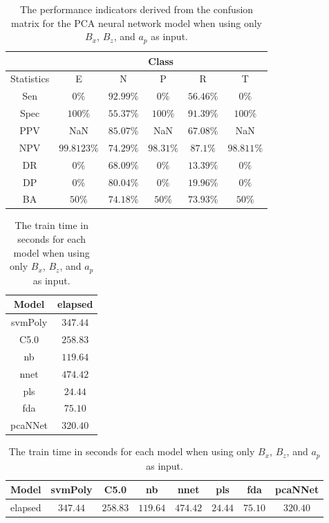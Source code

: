 \begin{table}[!ht]
	\centering
	\begin{tabular}{|c|c|c|c|c|c|}
		\hline
		 & \multicolumn{5}{c|}{Class} \\ \hline
		Statistics & E & N & P & R & T \\ \hline
		Sen & $0\%$ & $92.99\%$ & $0\%$ & $56.46\%$ & $0\%$ \\ \hline
		Spec & $100\%$ & $55.37\%$ & $100\%$ & $91.39\%$ & $100\%$ \\ \hline
		PPV & NaN & $85.07\%$ & NaN & $67.08\%$ & NaN \\ \hline
		NPV & $99.8123\%$ & $74.29\%$ & $98.31\%$ & $87.1\%$ & $98.811\%$ \\ \hline
		DR & $0\%$ & $68.09\%$ & $0\%$ & $13.39\%$ & $0\%$ \\ \hline
		DP & $0\%$ & $80.04\%$ & $0\%$ & $19.96\%$ & $0\%$ \\ \hline
		BA & $50\%$ & $74.18\%$ & $50\%$ & $73.93\%$ & $50\%$ \\ \hline
	\end{tabular}
	\caption{The performance indicators derived from the confusion matrix for the PCA neural network model when using only $B_{x}$, $B_{z}$, and $a_{p}$ as input.}
	\label{tab:cs:reverse:xzap:pcaNNet}
\end{table}

\begin{table}[!ht]
	\centering
	\begin{tabular}{|c|c|}
		\hline
		Model & elapsed \\ \hline
		svmPoly & $347.44$ \\ \hline
		C5.0 & $258.83$ \\ \hline
		nb & $119.64$ \\ \hline
		nnet & $474.42$ \\ \hline
		pls & $24.44$ \\ \hline
		fda & $75.10$ \\ \hline
		pcaNNet & $320.40$ \\ \hline
	\end{tabular}
	\caption{The train time in seconds for each model when using only $B_{x}$, $B_{z}$, and $a_{p}$ as input.}
	\label{tab:time:xzap:train}
\end{table}

\begin{table}[!ht]
	\centering
	\begin{tabular}{|c|c|c|c|c|c|c|c|}
		\hline
		Model & svmPoly & C5.0 & nb & nnet & pls & fda & pcaNNet \\ \hline
		elapsed & $347.44$ & $258.83$ & $119.64$ & $474.42$ & $24.44$ & $75.10$ & $320.40$ \\ \hline
	\end{tabular}
	\caption{The train time in seconds for each model when using only $B_{x}$, $B_{z}$, and $a_{p}$ as input.}
	\label{tab:time:reverse:xzap:train}
\end{table}

